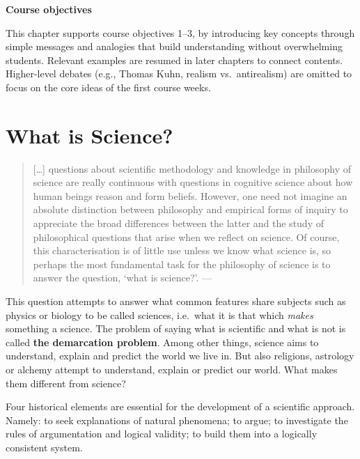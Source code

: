 \documentclass[
  12pt,
]{book}
\begin{document}
\begin{simplebox}

\textbf{Course objectives}

This chapter supports course objectives 1--3, by introducing key concepts through simple messages and analogies that build understanding without overwhelming students. Relevant examples are resumed in later chapters to connect contents. Higher-level debates (e.g., Thomas Kuhn, realism vs.~antirealism) are omitted to focus on the core ideas of the first course weeks.

\end{simplebox}

\section{What is Science?}\label{what-is-science}

\begin{quote}
{[}\ldots{]} questions about scientific methodology and knowledge in philosophy of science are really continuous with questions in cognitive science about how human beings reason and form beliefs. However, one need not imagine an absolute distinction between philosophy and empirical forms of inquiry to appreciate the broad differences between the latter and the study of philosophical questions that arise when we reflect on science.
Of course, this characterisation is of little use unless we know what science is, so perhaps the most fundamental task for the philosophy of science is to answer the question, `what is science?'. --- \citep{ladyman2012understanding}
\end{quote}

This question attempts to answer what common features share subjects such as physics or biology to be called sciences, i.e.~what it is that which \emph{makes} something a science. The problem of saying what is scientific and what is not is called \textbf{the demarcation problem}. Among other things, science aims to understand, explain and predict the world we live in. But also religions, astrology or alchemy attempt to understand, explain or predict our world. What makes them different from science?

Four historical elements are essential for the development of a scientific approach. Namely: to seek explanations of natural phenomena; to argue; to investigate the rules of argumentation and logical validity; to build them into a logically consistent system. \citep{johansson2016philosophy}
\end{document}
